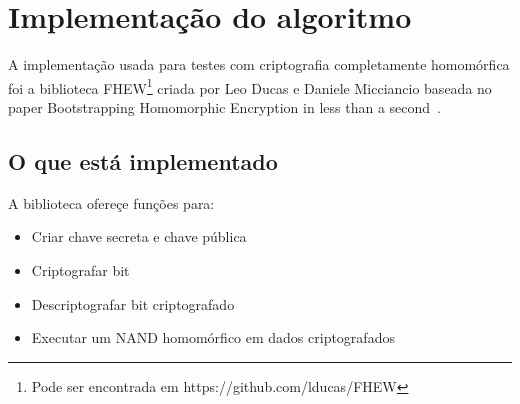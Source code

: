 \chapter{Implementação do algoritmo}
\label{resultados}
A implementação usada para testes com criptografia completamente homomórfica foi a biblioteca FHEW\footnote{Pode ser encontrada em https://github.com/lducas/FHEW} criada por Leo Ducas e Daniele Micciancio baseada no paper Bootstrapping Homomorphic Encryption in less than a second~\cite{fhew}.
	
\section{O que está implementado}
A biblioteca ofereçe funções para:
\begin{itemize}
	\item Criar chave secreta e chave pública
	\item Criptografar bit
	\item Descriptografar bit criptografado
	\item Executar um NAND homomórfico em dados criptografados
\end{itemize}